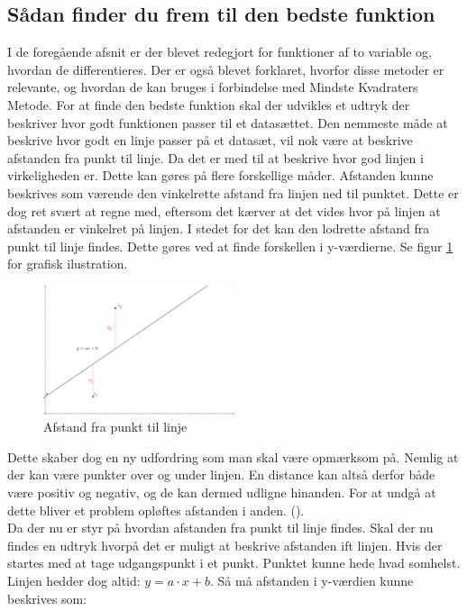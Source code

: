 \subsection{Sådan finder du frem til den bedste funktion}\label{sec:bedsteFunktion}
I de foregående afsnit er der blevet redegjort for funktioner af to variable og, hvordan de differentieres. Der er også blevet forklaret, hvorfor disse metoder er relevante, og hvordan de kan bruges i forbindelse med Mindste Kvadraters Metode. For at finde den bedste funktion skal der udvikles et udtryk der beskriver hvor godt funktionen passer til et datasættet. Den nemmeste måde at beskrive hvor godt en linje passer på et datasæt, vil nok være at beskrive afstanden fra punkt til linje. Da det er med til at beskrive hvor god linjen i virkeligheden er. Dette kan gøres på flere forskellige måder. Afstanden kunne beskrives som værende den vinkelrette afstand fra linjen ned til punktet. Dette er dog ret svært at regne med, eftersom det kærver at det vides hvor på linjen at afstanden er vinkelret på linjen. I stedet for det kan den lodrette afstand fra punkt til linje findes. Dette gøres ved at finde forskellen i y-værdierne. Se figur \ref{fig:afstandFraLinjeTilPunkt} for grafisk ilustration.
\begin{figure}
    \centering
    \includegraphics[width=0.5\textwidth]{figures/afstand.png}
    \caption{Afstand fra punkt til linje}
    \label{fig:afstandFraLinjeTilPunkt}
\end{figure}   
Dette skaber dog en ny udfordring som man skal være opmærksom på. Nemlig at der kan være punkter over og under linjen. En distance kan altså derfor både være positiv og negativ, og de kan dermed udligne hinanden. For at undgå at dette bliver et problem opløftes afstanden i anden. (\cite[2]{ForberedelsessetMaj2013}). \\ Da der nu er styr på hvordan afstanden fra punkt til linje findes. Skal der nu findes en udtryk hvorpå det er muligt at beskrive afstanden ift linjen. Hvis der startes med at tage udgangspunkt i et punkt. Punktet kunne hede hvad somhelst. Linjen hedder dog altid: $y = a \cdot x + b$. Så må afstanden i y-værdien kunne beskrives som:  
